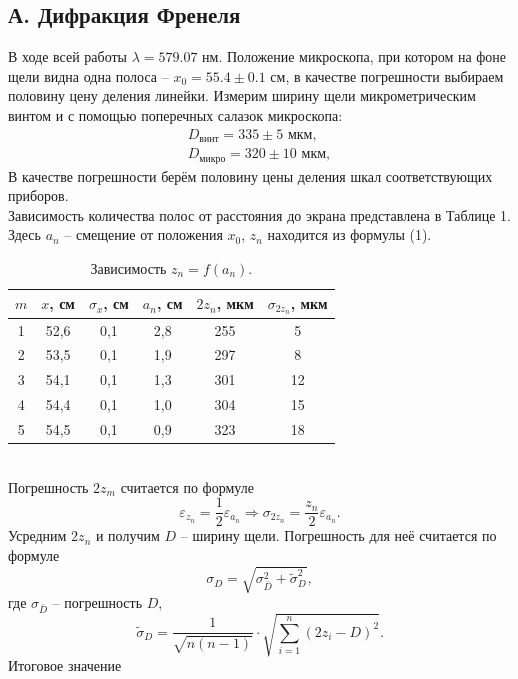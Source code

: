 \documentclass[a4paper,12pt]{article}
\begin{document}
\subsection*{А. Дифракция Френеля}
В ходе всей работы $\lambda = 579.07 \text{ нм}$.
Положение микроскопа, при котором на фоне щели видна одна полоса -- $x_0 = 55.4 \pm 0.1 \text{ см}$, в качестве погрешности выбираем половину цену деления линейки. Измерим ширину щели микрометрическим винтом и с помощью поперечных салазок микроскопа:
$$
\begin{array}{l}
D_{\text{винт}} = 335\pm 5 \text{ мкм},\\
D_{\text{микро}} = 320\pm 10 \text{ мкм},
\end{array}
$$
В качестве погрешности берём половину цены деления шкал соответствующих приборов.\\
Зависимость количества полос от расстояния до экрана представлена в Таблице 1. Здесь $a_n$ -- смещение от положения $x_0$, $z_n$ находится из формулы (1).
\begin{table}[h!]
\begin{tabular}{|c|c|c|c|c|c|}
\hline
$m$ & $x$, см&  $\sigma_x$, см  &  $a_n$, см & $2 z_n$, мкм & $\sigma_{2z_n}$, мкм \\
\hline
1 & 52,6 & 0,1 & 2,8 & 255 & 5\\
2 & 53,5 & 0,1 & 1,9 & 297 & 8\\
3 & 54,1 & 0,1 & 1,3 & 301 & 12\\
4 & 54,4 & 0,1 & 1,0 & 304 & 15\\
5 & 54,5 & 0,1 & 0,9 & 323 & 18\\
\hline
\end{tabular}
\centering
\caption{Зависимость $z_n = f(a_n)$.}
\end{table}\\
Погрешность $2z_m$ считается по формуле
$$
\varepsilon_{z_n} = \dfrac{1}{2} \varepsilon_{a_n} \Rightarrow \sigma_{2z_n}= \dfrac{z_n}{2} \varepsilon_{a_n}.
$$
Усредним $2z_n$ и получим $D$ -- ширину щели. Погрешность для неё считается по формуле 
$$
\sigma_D = \sqrt{\sigma_{\bar{D}}^2 + \tilde{\sigma}_{D}^2},
$$
где $\sigma_{\bar{D}}$ -- погрешность $D$, 
$$
\tilde{\sigma}_{D} = \dfrac{1}{\sqrt{n(n-1)}} \cdot \sqrt{\sum\limits_{i = 1}^n\left(2z_i - D\right)^2}.
$$
Итоговое значение 
\begin{center}
\end{center}
\end{document}
